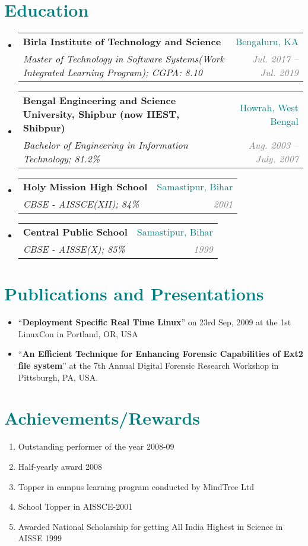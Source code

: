 \documentclass[letterpaper,11pt]{article}
\makeatletter
\newcommand{\resumeSubheading}[4]{
  \vspace{-1pt}\item
    \begin{tabular*}{0.97\textwidth}[t]{l@{\extracolsep{\fill}}r}
      \textbf{#1} & #2 \\
      \textit{\small#3} & \textit{\small #4} \\
    \end{tabular*}\vspace{-5pt}
}
\newcommand{\resumeSubHeadingListStart}{\begin{itemize}[leftmargin=*]}
\newcommand{\resumeSubHeadingListEnd}{\end{itemize}}
\makeatother
\begin{document}
\section{\textcolor{teal}{Education}}
  \resumeSubHeadingListStart
    \resumeSubheading
      {Birla Institute of Technology and Science}{\textcolor{teal}{Bengaluru, KA}}
      {Master of Technology in Software Systems(Work Integrated Learning Program);  CGPA: 8.10}{\textcolor{GRAY}{Jul. 2017 -- Jul. 2019}}
    \resumeSubheading
      {Bengal Engineering and Science University, Shipbur (now IIEST, Shibpur)}{\textcolor{teal}{Howrah, West Bengal}}
      {Bachelor of Engineering in Information Technology;  81.2\% }{\textcolor{GRAY}{Aug. 2003 -- July. 2007}}
      \resumeSubheading
      {Holy Mission High School}{\textcolor{teal}{Samastipur, Bihar}}
      {CBSE - AISSCE(XII); 84\%}{\textcolor{GRAY}{2001}}
      \resumeSubheading
      {Central Public School}{\textcolor{teal}{Samastipur, Bihar}}
      {CBSE - AISSE(X); 85\%}{\textcolor{GRAY}{1999}}
  \resumeSubHeadingListEnd

\section{\textcolor{teal}{Publications and Presentations}}
  \resumeSubHeadingListStart
    \item {“\textbf{Deployment Specific Real Time Linux}” on 23rd Sep, 2009 at the 1st LinuxCon in Portland, OR, USA}
    \item  {“\textbf{An Efficient Technique for Enhancing Forensic Capabilities of Ext2 file system}” at the 7th Annual Digital Forensic Research Workshop in Pittsburgh, PA, USA.}
  \resumeSubHeadingListEnd
  
  

\section{\textcolor{teal}{Achievements/Rewards}}
  \begin{enumerate}
    \item{Outstanding performer of the year 2008-09}
    \item{Half-yearly award 2008}
    \item{Topper in campus learning program conducted by MindTree Ltd}
    \item{School Topper in AISSCE-2001}
    \item{Awarded National Scholarship for getting All India Highest in Science in AISSE 1999}  
    \end{enumerate}


\end{document}
